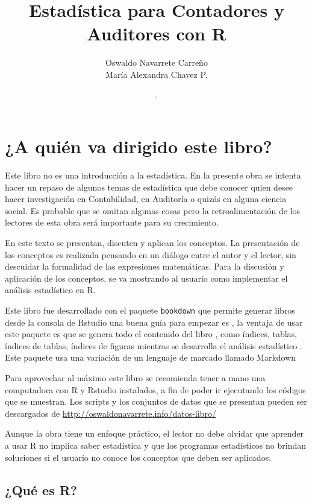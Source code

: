 \documentclass[letterpaper,]{book}
\title{Estadística para Contadores y Auditores con R}
\author{Oswaldo Navarrete Carreño \\ María Alexandra Chavez P.}
\date{.}
\begin{document}
\maketitle

{
\setcounter{tocdepth}{3}
\tableofcontents
}
\listoftables
\listoffigures
\hypertarget{a-quien-va-dirigido-este-libro}{%
\chapter{¿A quién va dirigido este libro?}\label{a-quien-va-dirigido-este-libro}}

Este libro no es una introducción a la estadística. En la presente obra se intenta hacer un repaso de algunos temas de estadística que debe conocer quien desee hacer investigación en Contabilidad, en Auditoría o quizás en alguna ciencia social. Es probable que se omitan algunas cosas pero la retroalimentación de los lectores de esta obra será importante para su crecimiento.

En este texto se presentan, discuten y aplican los conceptos. La presentación de los conceptos es realizada pensando en un diálogo entre el autor y el lector, sin descuidar la formalidad de las expresiones matemáticas. Para la discusión y aplicación de los conceptos, se va mostrando al usuario como implementar el análisis estadístico en R.

Este libro fue desarrollado con el paquete \texttt{bookdown} que permite generar libros desde la consola de Rstudio una buena guía para empezar es \citet{R-bookdown}, la ventaja de usar este paquete es que se genera todo el contenido del libro \citep{xie2015}, como índices, tablas, índices de tablas, índices de figuras mientras se desarrolla el análisis estadístico \citep{R-knitr}. Este paquete usa una variación de un lenguaje de marcado llamado Markdown \citep{R-rmarkdown}

Para aprovechar al máximo este libro se recomienda tener a mano una computadora con R y Rstudio instalados, a fin de poder ir ejecutando los códigos que se muestran. Los scripts y los conjuntos de datos que se presentan pueden ser descargados de \url{http://oswaldonavarrete.info/datos-libro/}

Aunque la obra tiene un enfoque práctico, el lector no debe olvidar que aprender a usar R no implica saber estadística y que los programas estadísticos no brindan soluciones si el usuario no conoce los conceptos que deben ser aplicados.

\hypertarget{que-es-r}{%
\section{¿Qué es R?}\label{que-es-r}}
\end{document}
